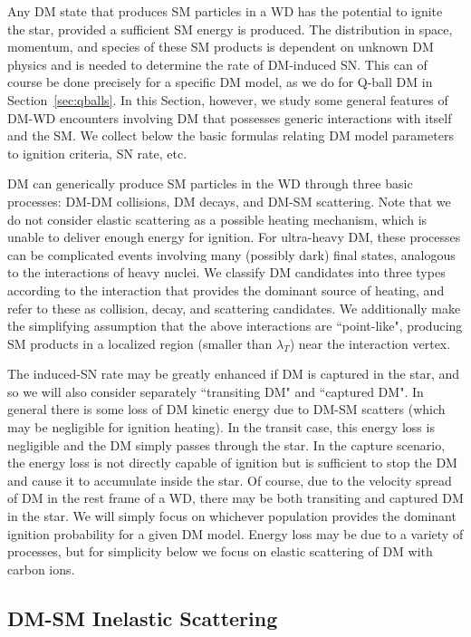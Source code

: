 Any DM state that produces SM particles in a WD has the potential to ignite the star, provided a sufficient SM energy is produced. 
The distribution in space, momentum, and species of these SM products is dependent on unknown DM physics and is needed to determine the rate of DM-induced SN. 
This can of course be done precisely for a specific DM model, as we do for Q-ball DM in Section~\ref{sec:qballs}.
In this Section, however, we study some general features of DM-WD encounters involving DM that possesses generic interactions with itself and the SM. 
We collect below the basic formulas relating DM model parameters to ignition criteria, SN rate, etc. 

DM can generically produce SM particles in the WD through three basic processes: DM-DM collisions, DM decays, and DM-SM scattering.
Note that we do not consider elastic scattering as a possible heating mechanism, which is unable to deliver enough energy for ignition.  
For ultra-heavy DM, these processes can be complicated events involving many (possibly dark) final states, analogous to the interactions of heavy nuclei.
We classify DM candidates into three types according to the interaction that provides the dominant source of heating, and refer to these as collision, decay, and scattering candidates.
We additionally make the simplifying assumption that the above interactions are ``point-like", producing SM products in a localized region (smaller than $\lambda_T$) near the interaction vertex.

The induced-SN rate may be greatly enhanced if DM is captured in the star, and so we will also consider separately ``transiting DM" and ``captured DM". 
In general there is some loss of DM kinetic energy due to DM-SM scatters (which may be negligible for ignition heating). 
In the transit case, this energy loss is negligible and the DM simply passes through the star.
In the capture scenario, the energy loss is not directly capable of ignition but is sufficient to stop the DM and cause it to accumulate inside the star.
Of course, due to the velocity spread of DM in the rest frame of a WD, there may be both transiting and captured DM in the star. 
We will simply focus on whichever population provides the dominant ignition probability for a given DM model.
Energy loss may be due to a variety of processes, but for simplicity below we focus on elastic scattering of DM with carbon ions. 

\subsection{DM-SM Inelastic Scattering}

